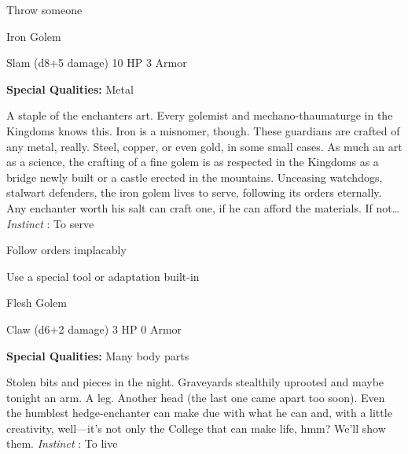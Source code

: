          
\item Throw someone

       
\stopitemize
       
\startMonsterName
Iron Golem	 
\stopMonsterName
       

Slam (d8+5 damage)	10 HP	3 Armor

       


       
\startMonsterQualities
         {\bf Special Qualities:}  Metal
\stopMonsterQualities
       
\startMonsterDescription
A staple of the enchanters art. Every golemist and mechano-thaumaturge in the Kingdoms knows this. Iron is a misnomer, though. These guardians are crafted of any metal, really. Steel, copper, or even gold, in some small cases. As much an art as a science, the crafting of a fine golem is as respected in the Kingdoms as a bridge newly built or a castle erected in the mountains. Unceasing watchdogs, stalwart defenders, the iron golem lives to serve, following its orders eternally. Any enchanter worth his salt can craft one, if he can afford the materials. If not… {\em Instinct} : To serve
\stopMonsterDescription
       
\startitemize[1,packed]
         
\item Follow orders implacably

         
\item Use a special tool or adaptation built-in

       
\stopitemize
       
\startMonsterName
Flesh Golem	 
\stopMonsterName
       

Claw (d6+2 damage)	3 HP	0 Armor

       


       
\startMonsterQualities
         {\bf Special Qualities:}  Many body parts
\stopMonsterQualities
       
\startMonsterDescription
Stolen bits and pieces in the night. Graveyards stealthily uprooted and maybe tonight an arm. A leg. Another head (the last one came apart too soon). Even the humblest hedge-enchanter can make due with what he can and, with a little creativity, well—it’s not only the College that can make life, hmm? We’ll show them. {\em Instinct} : To live
\stopMonsterDescription
       
